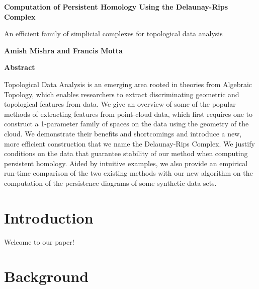 \documentclass[letterpaper,titlepage]{article}
\begin{document}
\begin{center}
    \Large
    \textbf{Computation of Persistent Homology Using the Delaunay-Rips Complex}
        
    \vspace{0.4cm}
    \large
    An efficient family of simplicial complexes for topological data analysis
        
    \vspace{0.4cm}
    \textbf{Amish Mishra and Francis Motta}
       
    \vspace{0.9cm}
    \textbf{Abstract}
\end{center}
Topological Data Analysis is an emerging area rooted in theories from Algebraic Topology, which enables researchers to extract discriminating geometric and topological features from data. We give an overview of some of the popular methods of extracting features from point-cloud data, which first requires one to construct a 1-parameter family of spaces on the data using the geometry of the cloud. We demonstrate their benefits and shortcomings and introduce a new, more efficient construction that we name the Delaunay-Rips Complex. We justify conditions on the data that guarantee stability of our method when computing persistent homology. Aided by intuitive examples, we also provide an empirical run-time comparison of the two existing methods with our new algorithm on the computation of the persistence diagrams of some synthetic data sets.



\section{Introduction}
Welcome to our paper!

\section{Background}
\end{document}
